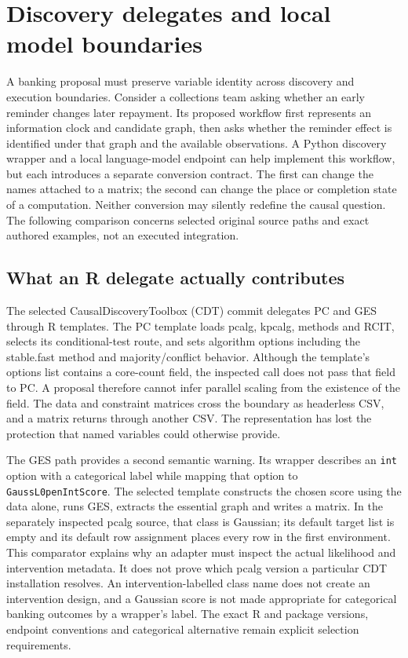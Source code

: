 \section[Discovery delegates and local model boundaries]{Discovery delegates and local model boundaries}
\label{sec:exec28-bp}
A banking proposal must preserve variable identity across discovery and execution boundaries.
Consider a collections team asking whether an early reminder changes later repayment.
Its proposed workflow first represents an information clock and candidate graph, then asks whether
the reminder effect is identified under that graph and the available observations. A Python
discovery wrapper and a local language-model endpoint can help implement this workflow, but each
introduces a separate conversion contract. The first can change the names attached to a matrix;
the second can change the place or completion state of a computation. Neither conversion may
silently redefine the causal question. The following comparison concerns selected original
source paths and exact authored examples, not an executed integration.

\subsection{What an R delegate actually contributes}
The selected CausalDiscoveryToolbox (CDT) commit delegates PC and GES through R templates.
The PC template loads pcalg, kpcalg, methods and RCIT, selects its conditional-test route, and
sets algorithm options including the stable.fast method and majority/conflict behavior.
Although the template's options list contains a core-count field, the inspected call does not
pass that field to PC. A proposal therefore cannot infer parallel scaling from the existence
of the field. The data and constraint matrices cross the boundary as headerless CSV, and a
matrix returns through another CSV. The representation has lost the protection that named
variables could otherwise provide.~\citep{exec28_bp_cdt}

The GES path provides a second semantic warning. Its wrapper describes an \texttt{int} option
with a categorical label while mapping that option to \texttt{GaussL0penIntScore}. The selected
template constructs the chosen score using the data alone, runs GES, extracts the essential
graph and writes a matrix. In the separately inspected pcalg source, that class is Gaussian;
its default target list is empty and its default row assignment places every row in the first
environment. This comparator explains why an adapter must inspect the actual likelihood and
intervention metadata. It does not prove which pcalg version a particular CDT installation
resolves. An intervention-labelled class name does not create an intervention design, and a
Gaussian score is not made appropriate for categorical banking outcomes by a wrapper's label.
The exact R and package versions, endpoint conventions and categorical alternative remain
explicit selection requirements.~\citep{exec28_bp_cdt}

